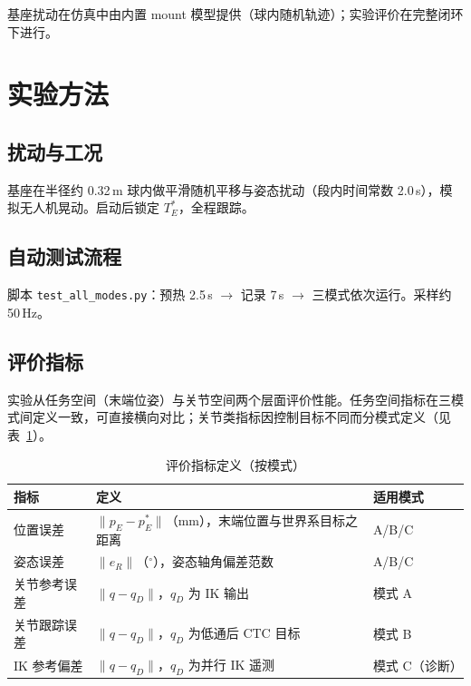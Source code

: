 \documentclass[UTF8, a4paper, 12pt]{ctexart}
\begin{document}
基座扰动在仿真中由内置 mount 模型提供（球内随机轨迹）；实验评价在完整闭环下进行。

\section{实验方法}

\subsection{扰动与工况}

基座在半径约 0.32\,m 球内做平滑随机平移与姿态扰动（段内时间常数 2.0\,s），模拟无人机晃动。启动后锁定 $T_E^*$，全程跟踪。

\subsection{自动测试流程}

脚本 \texttt{test\_all\_modes.py}：预热 2.5\,s $\rightarrow$ 记录 7\,s $\rightarrow$ 三模式依次运行。采样约 50\,Hz。

\subsection{评价指标}

实验从任务空间（末端位姿）与关节空间两个层面评价性能。任务空间指标在三模式间定义一致，可直接横向对比；关节类指标因控制目标不同而分模式定义（见表~\ref{tab:metrics}）。

\begin{table}[H]
  \centering
  \caption{评价指标定义（按模式）}
  \label{tab:metrics}
  \renewcommand{\arraystretch}{1.25}
  \small
  \begin{tabularx}{\textwidth}{@{} >{\raggedright\arraybackslash}p{2.4cm} X >{\raggedright\arraybackslash}p{2.6cm} @{}}
    \toprule
    指标 & 定义 & 适用模式 \\
    \midrule
    位置误差 & $\|p_E-p_E^*\|$（mm），末端位置与世界系目标之距离 & A/B/C \\
    姿态误差 & $\|e_R\|$（$^\circ$），姿态轴角偏差范数 & A/B/C \\
    关节参考误差 & $\|q-q_D\|$，$q_D$ 为 IK 输出 & 模式 A \\
    关节跟踪误差 & $\|q-q_D\|$，$q_D$ 为低通后 CTC 目标 & 模式 B \\
    IK 参考偏差 & $\|q-q_D\|$，$q_D$ 为并行 IK 遥测 & 模式 C（诊断） \\
    \bottomrule
  \end{tabularx}
\end{table}
\end{document}
